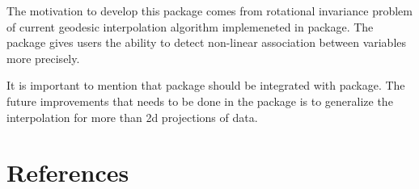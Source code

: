 The motivation to develop this package comes from rotational invariance problem of current geodesic interpolation algorithm implemeneted in  package. The package gives users the ability to detect non-linear association between variables more precisely.

It is important to mention that  package should be integrated with  package. The future improvements that needs to be done in the package is to generalize the interpolation for more than 2d projections of data.

\hypertarget{references}{%
\section*{References}\label{references}}

